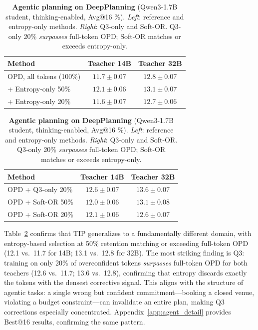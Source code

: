 \documentclass{article}
\begin{document}
\begin{table}[t]
\centering
\caption{\textbf{Agentic planning on DeepPlanning} (Qwen3-1.7B student, thinking-enabled, Avg@16 \%).
\emph{Left}: reference and entropy-only methods. \emph{Right}: Q3-only and Soft-OR.
Q3-only 20\% \emph{surpasses} full-token OPD; Soft-OR matches or exceeds entropy-only.}
\label{tab:agentic_results}
\footnotesize
\begin{minipage}[t]{0.48\textwidth}
\centering
\begin{tabular}{l cc}
\toprule
Method & Teacher 14B & Teacher 32B \\
\midrule
OPD, all tokens (100\%) & $11.7{\pm}0.07$ & $12.8{\pm}0.07$ \\
+ Entropy-only 50\% & $12.1{\pm}0.06$ & $13.1{\pm}0.07$ \\
+ Entropy-only 20\% & $11.6{\pm}0.07$ & $12.7{\pm}0.06$ \\
\bottomrule
\end{tabular}
\end{minipage}%
\hfill%
\begin{minipage}[t]{0.48\textwidth}
\centering
\begin{tabular}{l cc}
\toprule
Method & Teacher 14B & Teacher 32B \\
\midrule
OPD + Q3-only 20\% & $\mathbf{12.6}{\pm}0.07$ & $\mathbf{13.6}{\pm}0.07$ \\
OPD + Soft-OR 50\% & $12.0{\pm}0.06$ & $13.1{\pm}0.08$ \\
OPD + Soft-OR 20\% & $12.1{\pm}0.06$ & $12.6{\pm}0.07$ \\
\bottomrule
\end{tabular}
\end{minipage}
\end{table}

Table~\ref{tab:agentic_results} confirms that TIP generalizes to a fundamentally different domain, with entropy-based selection at 50\% retention matching or exceeding full-token OPD (12.1 vs.\ 11.7 for 14B; 13.1 vs.\ 12.8 for 32B).
The most striking finding is Q3: training on only 20\% of overconfident tokens \emph{surpasses} full-token OPD for both teachers (12.6 vs.\ 11.7; 13.6 vs.\ 12.8), confirming that entropy discards exactly the tokens with the densest corrective signal.
This aligns with the structure of agentic tasks: a single wrong but confident commitment---booking a closed venue, violating a budget constraint---can invalidate an entire plan, making Q3 corrections especially concentrated.
Appendix~\ref{app:agent_detail} provides Best@16 results, confirming the same pattern.
\end{document}
